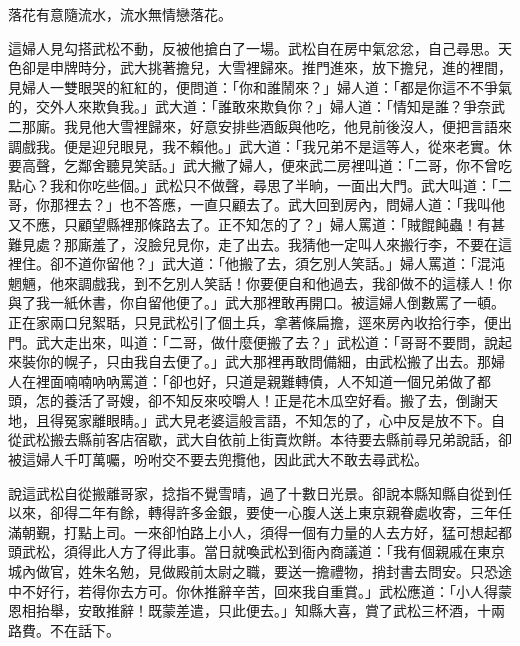 落花有意隨流水，流水無情戀落花。

這婦人見勾搭武松不動，反被他搶白了一場。武松自在房中氣忿忿，自己尋思。天色卻是申牌時分，武大挑著擔兒，大雪裡歸來。推門進來，放下擔兒，進的裡間，見婦人一雙眼哭的紅紅的，便問道：「你和誰鬧來？」婦人道：「都是你這不不爭氣的，交外人來欺負我。」武大道：「誰敢來欺負你？」婦人道：「情知是誰？爭奈武二那廝。我見他大雪裡歸來，好意安排些酒飯與他吃，他見前後沒人，便把言語來調戲我。便是迎兒眼見，我不賴他。」武大道：「我兄弟不是這等人，從來老實。休要高聲，乞鄰舍聽見笑話。」武大撇了婦人，便來武二房裡叫道：「二哥，你不曾吃點心？我和你吃些個。」武松只不做聲，尋思了半晌，一面出大門。武大叫道：「二哥，你那裡去？」也不答應，一直只顧去了。武大回到房內，問婦人道：「我叫他又不應，只顧望縣裡那條路去了。正不知怎的了？」婦人罵道：「賊餛飩蟲！有甚難見處？那廝羞了，沒臉兒見你，走了出去。我猜他一定叫人來搬行李，不要在這裡住。卻不道你留他？」武大道：「他搬了去，須乞別人笑話。」婦人罵道：「混沌魍魎，他來調戲我，到不乞別人笑話！你要便自和他過去，我卻做不的這樣人！你與了我一紙休書，你自留他便了。」武大那裡敢再開口。被這婦人倒數罵了一頓。正在家兩口兒絮聒，只見武松引了個土兵，拿著條扁擔，逕來房內收拾行李，便出門。武大走出來，叫道：「二哥，做什麼便搬了去？」武松道：「哥哥不要問，說起來裝你的幌子，只由我自去便了。」武大那裡再敢問備細，由武松搬了出去。那婦人在裡面喃喃吶吶罵道：「卻也好，只道是親難轉債，人不知道一個兄弟做了都頭，怎的養活了哥嫂，卻不知反來咬嚼人！正是花木瓜空好看。搬了去，倒謝天地，且得冤家離眼睛。」武大見老婆這般言語，不知怎的了，心中反是放不下。自從武松搬去縣前客店宿歇，武大自依前上街賣炊餅。本待要去縣前尋兄弟說話，卻被這婦人千叮萬囑，吩咐交不要去兜攬他，因此武大不敢去尋武松。

說這武松自從搬離哥家，捻指不覺雪晴，過了十數日光景。卻說本縣知縣自從到任以來，卻得二年有餘，轉得許多金銀，要使一心腹人送上東京親眷處收寄，三年任滿朝覲，打點上司。一來卻怕路上小人，須得一個有力量的人去方好，猛可想起都頭武松，須得此人方了得此事。當日就喚武松到衙內商議道：「我有個親戚在東京城內做官，姓朱名勉，見做殿前太尉之職，要送一擔禮物，捎封書去問安。只恐途中不好行，若得你去方可。你休推辭辛苦，回來我自重賞。」武松應道：「小人得蒙恩相抬舉，安敢推辭！既蒙差遣，只此便去。」知縣大喜，賞了武松三杯酒，十兩路費。不在話下。

